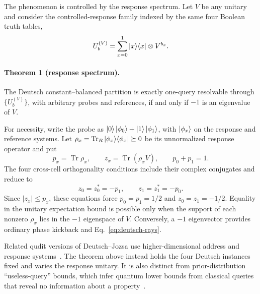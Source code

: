 \documentclass[
  aps,
  prl,
  reprint,
  nofootinbib
]{revtex4-2}
\begin{document}
The phenomenon is controlled by the response spectrum. Let \(V\) be any
unitary and consider the controlled-response family indexed by the same four
Boolean truth tables,
\begin{equation}
 U_b^{(V)}
 =\sum_{x=0}^1\ket x\!\bra x\otimes V^{b_x}.
 \label{eq:response-oracle}
\end{equation}
\paragraph{Theorem 1 (response spectrum).}
The Deutsch constant--balanced
partition is exactly one-query resolvable through
\(\{U_b^{(V)}\}\), with arbitrary probes and references, if and only if
\(-1\) is an eigenvalue of \(V\).

For necessity, write the probe as
\(\ket0\ket{\phi_0}+\ket1\ket{\phi_1}\), with \(\ket{\phi_x}\) on the
response and reference systems. Let
\(\rho_x=\operatorname{Tr}_R\ket{\phi_x}\!\bra{\phi_x}\succeq0\) be its
unnormalized response operator and put
\begin{equation}
 p_x=\operatorname{Tr}\rho_x,\qquad
 z_x=\operatorname{Tr}(\rho_x V),\qquad p_0+p_1=1.
 \label{eq:response-blocks}
\end{equation}
The four cross-cell orthogonality conditions include their complex
conjugates and reduce to
\begin{equation}
 z_0=z_0^*=-p_1,\qquad z_1=z_1^*=-p_0.
 \label{eq:response-constraints}
\end{equation}
Since \(|z_x|\le p_x\), these equations force
\(p_0=p_1=1/2\) and \(z_0=z_1=-1/2\). Equality in the unitary expectation
bound is possible only when the support of each nonzero \(\rho_x\) lies in
the \(-1\) eigenspace of \(V\). Conversely, a \(-1\) eigenvector provides
ordinary phase kickback and Eq.~\eqref{eq:deutsch-rays}.

Related qudit versions of Deutsch--Jozsa use higher-dimensional address and
response systems~\cite{Cereceda2004QuditDeutsch}. The theorem above instead
holds the four Deutsch instances fixed and varies the response unitary. It is
also distinct from prior-distribution ``useless-query'' bounds, which infer
quantum lower bounds from classical queries that reveal no information about a
property~\cite{MeyerPommersheim2011}.
\end{document}
